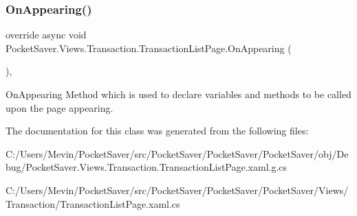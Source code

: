 \subsubsection{\texorpdfstring{On\+Appearing()}{OnAppearing()}}
{\footnotesize\ttfamily override async void Pocket\+Saver.\+Views.\+Transaction.\+Transaction\+List\+Page.\+On\+Appearing (\begin{DoxyParamCaption}{ }\end{DoxyParamCaption})\hspace{0.3cm}{\ttfamily [inline]}, {\ttfamily [protected]}}



On\+Appearing Method which is used to declare variables and methods to be called upon the page appearing. 



The documentation for this class was generated from the following files\+:\begin{DoxyCompactItemize}
\item 
C\+:/\+Users/\+Mevin/\+Pocket\+Saver/src/\+Pocket\+Saver/\+Pocket\+Saver/\+Pocket\+Saver/obj/\+Debug/Pocket\+Saver.\+Views.\+Transaction.\+Transaction\+List\+Page.\+xaml.\+g.\+cs\item 
C\+:/\+Users/\+Mevin/\+Pocket\+Saver/src/\+Pocket\+Saver/\+Pocket\+Saver/\+Pocket\+Saver/\+Views/\+Transaction/Transaction\+List\+Page.\+xaml.\+cs\end{DoxyCompactItemize}
